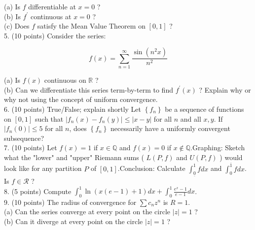 \documentclass[10pt]{article}
\begin{document}
(a) Is $f$ differentiable at $x=0$ ?\\
(b) Is $f^{\prime}$ continuous at $x=0$ ?\\
(c) Does $f$ satisfy the Mean Value Theorem on $[0,1]$ ?\\
5. (10 points) Consider the series:

$$
f(x)=\sum_{n=1}^{\infty} \frac{\sin \left(n^{2} x\right)}{n^{2}}
$$

(a) Is $f(x)$ continuous on $\mathbb{R}$ ?\\
(b) Can we differentiate this series term-by-term to find $f^{\prime}(x)$ ? Explain why or why not using the concept of uniform convergence.\\
6. (10 points) True/False; explain shortly Let $\left\{f_{n}\right\}$ be a sequence of functions on $[0,1]$ such that $\left|f_{n}(x)-f_{n}(y)\right| \leq|x-y|$ for all $n$ and all $x, y$. If $\left|f_{n}(0)\right| \leq 5$ for all $n$, does $\left\{f_{n}\right\}$ necessarily have a uniformly convergent subsequence?\\
7. (10 points) Let $f(x)=1$ if $x \in \mathbb{Q}$ and $f(x)=0$ if $x \notin \mathbb{Q}$.Graphing: Sketch what the "lower" and "upper" Riemann sums ( $L(P, f)$ and $U(P, f)$ ) would look like for any partition $P$ of $[0,1]$.Conclusion: Calculate $\int_{\underline{0}}^{1} f d x$ and $\int_{0}^{\overline{1}} f d x$. Is $f \in \mathscr{R}$ ?\\
8. (5 points) Compute $\int_{0}^{1} \ln (x(e-1)+1) d x+\int_{0}^{1} \frac{e^{x}-1}{e-1} d x$.\\
9. (10 points) The radius of convergence for $\sum c_{n} z^{n}$ is $R=1$.\\
(a) Can the series converge at every point on the circle $|z|=1$ ?\\
(b) Can it diverge at every point on the circle $|z|=1$ ?
\end{document}
